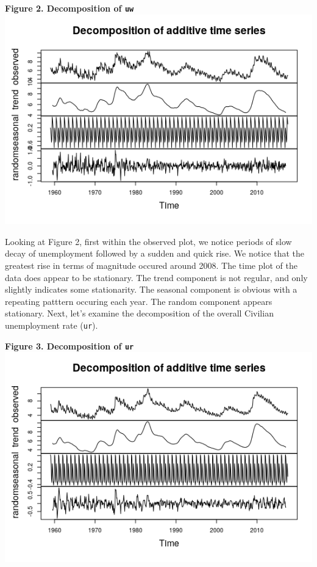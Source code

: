 \documentclass[11pt]{article}
\begin{document}
\begin{center}
\textbf{Figure 2. Decomposition of \tt{uw}}
\includegraphics[scale=1]{decom-uw}
\end{center}
Looking at Figure 2, first within the observed plot, we notice periods of slow decay of unemployment followed by a sudden and quick rise. We notice that the greatest rise in terms of magnitude occured around 2008. The time plot of the data does appear to be stationary. The trend component is not regular, and only slightly indicates some stationarity. The seasonal component is obvious with a repeating patttern occuring each year. The random component appears stationary. Next, let's examine the decomposition of the overall Civilian unemployment rate ({\tt ur}).
\begin{center}
\textbf{Figure 3. Decomposition of \tt{ur}}
\includegraphics[scale=1]{decom-ur}
\end{center}
\end{document}
